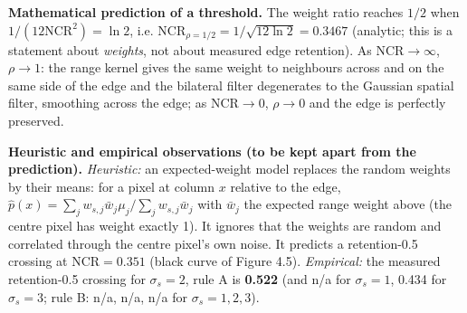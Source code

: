 \documentclass[10pt,a4paper]{article}
\begin{document}
\textbf{Mathematical prediction of a threshold.} The weight ratio reaches $1/2$ when $1/(12\mathrm{NCR}^2)=\ln2$, i.e. $\mathrm{NCR}_{\rho=1/2}=1/\sqrt{12\ln2}=0.3467$ (analytic; this is a statement about \textit{weights}, not about measured edge retention). As $\mathrm{NCR}\to\infty$, $\rho\to1$: the range kernel gives the same weight to neighbours across and on the same side of the edge and the bilateral filter degenerates to the Gaussian spatial filter, smoothing across the edge; as $\mathrm{NCR}\to0$, $\rho\to0$ and the edge is perfectly preserved.

\textbf{Heuristic and empirical observations (to be kept apart from the prediction).} \textit{Heuristic:} an expected-weight model replaces the random weights by their means: for a pixel at column $x$ relative to the edge, $\hat p(x)=\sum_jw_{s,j}\bar w_j\mu_j/\sum_jw_{s,j}\bar w_j$ with $\bar w_j$ the expected range weight above (the centre pixel has weight exactly 1). It ignores that the weights are random and correlated through the centre pixel's own noise. It predicts a retention-0.5 crossing at $\mathrm{NCR}=0.351$ (black curve of Figure 4.5). \textit{Empirical:} the measured retention-0.5 crossing for $\sigma_s=2$, rule A is \textbf{0.522} (and n/a for $\sigma_s=1$, 0.434 for $\sigma_s=3$; rule B: n/a, n/a, n/a for $\sigma_s=1,2,3$).
\end{document}
